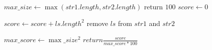 \begin{algorithmic}[1]

\State $max\_size \gets \max(str1.length, str2.length)$
	\State return $100$
\EndIf
\State $score \gets 0$

	\State $score \gets score + ls.length^2 $
	\State remove $ls$ from $str1$ and $str2$
\EndWhile

\State $max\_score \gets \max\_size^2$
\State $return \frac{score}{max\_score * 100} $

\EndFunction
\end{algorithmic}